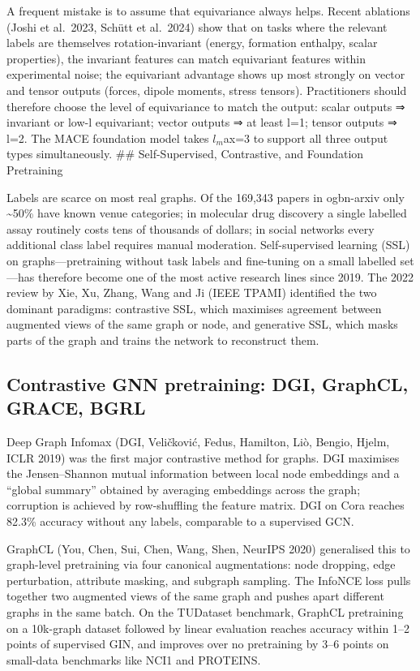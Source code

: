 A frequent mistake is to assume that equivariance always helps. Recent ablations (Joshi et al.~2023, Schütt et al.~2024) show that on tasks where the relevant labels are themselves rotation-invariant (energy, formation enthalpy, scalar properties), the invariant features can match equivariant features within experimental noise; the equivariant advantage shows up most strongly on vector and tensor outputs (forces, dipole moments, stress tensors). Practitioners should therefore choose the level of equivariance to match the output: scalar outputs ⇒ invariant or low-l equivariant; vector outputs ⇒ at least l=1; tensor outputs ⇒ l=2. The MACE foundation model takes \(l_m\)ax=3 to support all three output types simultaneously.
\#\# Self-Supervised, Contrastive, and Foundation Pretraining

Labels are scarce on most real graphs. Of the 169,343 papers in ogbn-arxiv only \textasciitilde50\% have known venue categories; in molecular drug discovery a single labelled assay routinely costs tens of thousands of dollars; in social networks every additional class label requires manual moderation. Self-supervised learning (SSL) on graphs---pretraining without task labels and fine-tuning on a small labelled set---has therefore become one of the most active research lines since 2019. The 2022 review by Xie, Xu, Zhang, Wang and Ji (IEEE TPAMI) identified the two dominant paradigms: contrastive SSL, which maximises agreement between augmented views of the same graph or node, and generative SSL, which masks parts of the graph and trains the network to reconstruct them.

\subsection{Contrastive GNN pretraining: DGI, GraphCL, GRACE, BGRL}\label{contrastive-gnn-pretraining-dgi-graphcl-grace-bgrl}

Deep Graph Infomax (DGI, Veličković, Fedus, Hamilton, Liò, Bengio, Hjelm, ICLR 2019) was the first major contrastive method for graphs. DGI maximises the Jensen--Shannon mutual information between local node embeddings and a ``global summary'' obtained by averaging embeddings across the graph; corruption is achieved by row-shuffling the feature matrix. DGI on Cora reaches 82.3\% accuracy without any labels, comparable to a supervised GCN.

GraphCL (You, Chen, Sui, Chen, Wang, Shen, NeurIPS 2020) generalised this to graph-level pretraining via four canonical augmentations: node dropping, edge perturbation, attribute masking, and subgraph sampling. The InfoNCE loss pulls together two augmented views of the same graph and pushes apart different graphs in the same batch. On the TUDataset benchmark, GraphCL pretraining on a 10k-graph dataset followed by linear evaluation reaches accuracy within 1--2 points of supervised GIN, and improves over no pretraining by 3--6 points on small-data benchmarks like NCI1 and PROTEINS.

